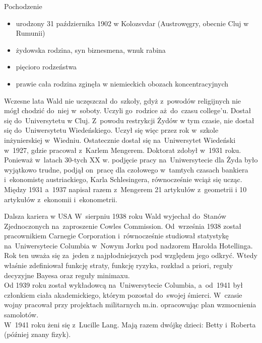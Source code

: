 \documentclass[11pt,pdftex,mathserif]{beamer}\usepackage[]{graphicx}\usepackage[]{color}
\theoremstyle{definition}
\begin{document}



\begin{frame}{Pochodzenie}
\begin{itemize}
\item urodzony 31 października 1902 w Kolozsvdar (Austrowęgry, obecnie Cluj w Rumunii)
\item żydowska rodzina, syn biznesmena, wnuk rabina
\item pięcioro rodzeństwa
\item prawie cała rodzina zginęła w niemieckich obozach koncentracyjnych
\end{itemize}
\end{frame}


\begin{frame}{Wczesne lata}
Wald nie uczęszczał do~szkoły, gdyż z~powodów religijnych nie mógł chodzić do~niej w~soboty. Uczyli go~rodzice aż~do~czasu college'u. Dostał się do~Universytetu w Cluj. Z~powodu restrykcji Żydów w tym czasie, nie dostał się do~Uniwersytetu Wiedeńskiego. Uczył się więc przez rok w~szkole inżynierskiej w~Wiedniu. \pause Ostatecznie dostał się na~Uniwersytet Wiedeński w~1927, gdzie pracował z~Karlem Mengerem. Doktorat zdobył w~1931 roku. Ponieważ w~latach 30-tych XX w. podjęcie pracy na~Uniwersytecie dla Żyda było wyjątkowo trudne, podjął on~pracę dla czołowego w~tamtych czasach bankiera i~ekonomistę austriackiego, Karla Schlesingera, równocześnie wciąż się ucząc. \pause Między 1931 a~1937 napisał razem z~Mengerem 21 artykułów z~geometrii i 10 artykułów z~ekonomii i~ekonometrii.
\end{frame}


\begin{frame}{Dalsza kariera w USA}
W~sierpniu 1938 roku Wald wyjechał do~Stanów Zjednoczonych na~zaproszenie Cowles Commission. Od~września 1938 został pracownikiem Carnegie Corporation i~równocześnie studiował statystykę na~Uniwersytecie Columbia w~Nowym Jorku pod nadzorem Harolda Hotellinga. Rok ten uważa się za~jeden z najpłodniejszych pod względem jego odkryć. Wtedy właśnie zdefiniował funkcję straty, funkcję ryzyka, rozkład a priori, reguły decyzyjne Bayesa oraz reguły minimaxu.\\ \pause
Od 1939 roku został wykładowcą na~Uniwersytecie Columbia, a~od~1941 był członkiem ciała akademickiego, którym pozostał do~swojej śmierci. W~czasie wojny pracował przy projektach militarnych m.in. opracowując plan wzmocnienia samolotów.\\ \pause
W~1941 roku żeni się z~Lucille Lang. Mają razem dwójkę dzieci: Betty i~Roberta (później znany fizyk).
\end{frame}
\end{document}
